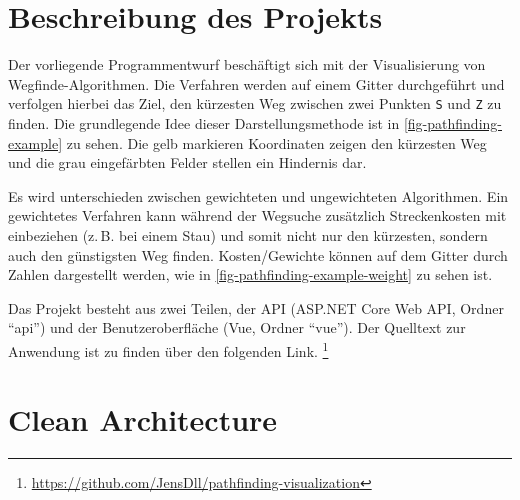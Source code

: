 \documentclass[
  ngerman,
  a4paper,
  12pt
]{article}
\begin{document}
\tableofcontents
\newpage
\onehalfspacing
\part{Beschreibung des Projekts}
Der vorliegende Programmentwurf beschäftigt sich mit der
Visualisierung von Wegfinde-Algo\-rithmen.
Die Verfahren werden auf einem Gitter durchgeführt und
verfolgen hierbei das Ziel, den kürzesten Weg zwischen zwei Punkten
\texttt{S} und \texttt{Z} zu finden.
Die grundlegende Idee dieser Darstellungsmethode ist in
\autoref{fig-pathfinding-example} zu sehen.
Die gelb markieren Koordinaten zeigen den kürzesten Weg und die
grau eingefärbten Felder stellen ein Hindernis dar.



\noindent
Es wird unterschieden zwischen gewichteten und ungewichteten
Algorithmen. Ein gewichtetes Verfahren kann während der Wegsuche zusätzlich
Streckenkosten mit einbeziehen (z.\,B. bei einem Stau)
und somit nicht nur den kürzesten, sondern
auch den günstigsten Weg finden. Kosten/Gewichte können auf dem Gitter durch
Zahlen dargestellt werden, wie in \autoref{fig-pathfinding-example-weight}
zu sehen ist.



\noindent
Das Projekt besteht aus zwei Teilen, der API (ASP.NET Core Web API, Ordner \enquote{api})
und der Benutzeroberfläche (Vue, Ordner \enquote{vue}). Der Quelltext
zur Anwendung ist zu finden über den folgenden Link.
\footnote{\url{https://github.com/JensDll/pathfinding-visualization}}
\newpage

\part{Clean Architecture}


\end{document}
